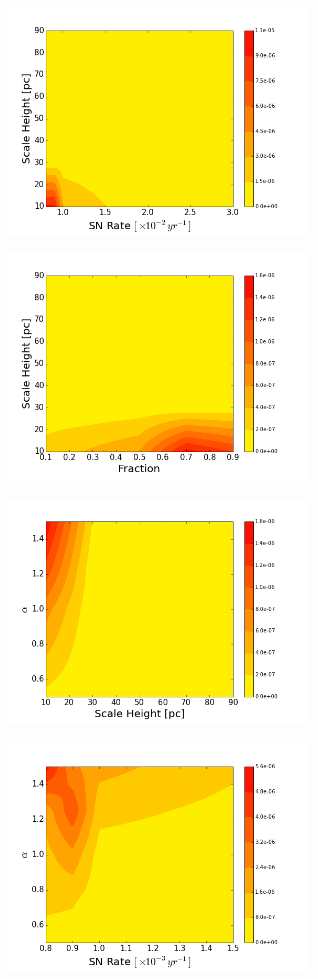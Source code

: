 \documentclass[10pt,a4paper]{article}
\begin{document}
\begin{figure}[h!]
	\begin{subfigure}[b]{0.51\textwidth}
		\includegraphics[width=8cm]{ScaleRate_gamma26.png}
		\caption{}
	\end{subfigure}
	\begin{subfigure}[b]{0.5\textwidth}
		\includegraphics[width=8cm]{ScaleFraction_gamma26.png}
		\caption{}
	\end{subfigure}
	\begin{subfigure}[b]{0.5\textwidth}
		\includegraphics[width=8cm]{AlphaScale_gamma26.png}
		\caption{}
	\end{subfigure}
	\begin{subfigure}[b]{0.5\textwidth}
		\includegraphics[width=8cm]{AlphaRate_gamma26.png}

\end{subfigure}
\end{figure}
\end{document}
